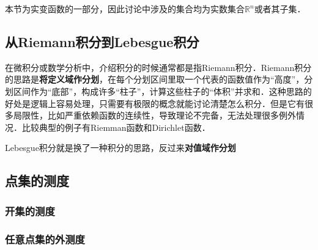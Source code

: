 


本节为实变函数的一部分，因此讨论中涉及的集合均为实数集合$\mathbb{R}^n$或者其子集．


\subsection{从Riemann积分到Lebesgue积分}


在微积分或数学分析中，介绍积分的时候通常都是指Riemann积分．Riemann积分的思路是\textbf{将定义域作分划}，在每个分划区间里取一个代表的函数值作为“高度”，分划区间作为“底部”，构成许多“柱子”，计算这些柱子的“体积”并求和．这种思路的好处是逻辑上容易处理，只需要有极限的概念就能讨论清楚怎么积分．但是它有很多局限性，比如严重依赖函数的连续性，导致理论不完备，无法处理很多例外情况．比较典型的例子有Riemman函数和Dirichlet函数．

Lebesgue积分就是换了一种积分的思路，反过来\textbf{对值域作分划}




\subsection{点集的测度}

\subsubsection{开集的测度}



\subsubsection{任意点集的外测度}




















